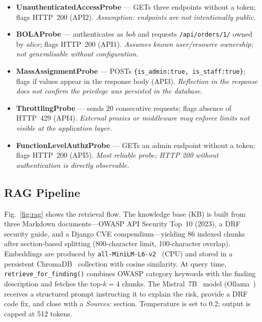 \documentclass[conference]{IEEEtran}
\begin{document}
\begin{itemize}
\item \textbf{UnauthenticatedAccessProbe} — GETs three endpoints without a
  token; flags HTTP~200 (API2). \textit{Assumption: endpoints are not
  intentionally public.}
\item \textbf{BOLAProbe} — authenticates as \textit{bob} and requests
  \texttt{/api/orders/1/} owned by \textit{alice}; flags HTTP~200 (API1).
  \textit{Assumes known user/resource ownership; not generalisable without
  configuration.}
\item \textbf{MassAssignmentProbe} — POSTs \texttt{\{is\_admin:true,
  is\_staff:true\}}; flags if values appear in the response body (API3).
  \textit{Reflection in the response does not confirm the privilege was
  persisted in the database.}
\item \textbf{ThrottlingProbe} — sends 20 consecutive requests; flags absence
  of HTTP~429 (API4). \textit{External proxies or middleware may enforce
  limits not visible at the application layer.}
\item \textbf{FunctionLevelAuthzProbe} — GETs an admin endpoint without a
  token; flags HTTP~200 (API5). \textit{Most reliable probe; HTTP 200 without
  authentication is directly observable.}
\end{itemize}

\subsection{RAG Pipeline}

Fig.~\ref{fig:rag} shows the retrieval flow. The knowledge base (KB) is built
from three Markdown documents—OWASP API Security Top~10 (2023), a DRF security
guide, and a Django CVE compendium—yielding 86 indexed chunks after
section-based splitting (800-character limit, 100-character overlap). Embeddings
are produced by \texttt{all-MiniLM-L6-v2}~\cite{sentencetransformers} (CPU)
and stored in a persistent ChromaDB~\cite{chromadb} collection with cosine
similarity. At query time, \texttt{retrieve\_for\_finding()} combines OWASP
category keywords with the finding description and fetches the top-$k{=}4$
chunks. The Mistral~7B~\cite{mistral} model (Ollama~\cite{ollama}) receives a
structured prompt instructing it to explain the risk, provide a DRF code fix,
and close with a \textit{Sources:} section. Temperature is set to 0.2; output
is capped at 512 tokens.
\end{document}
